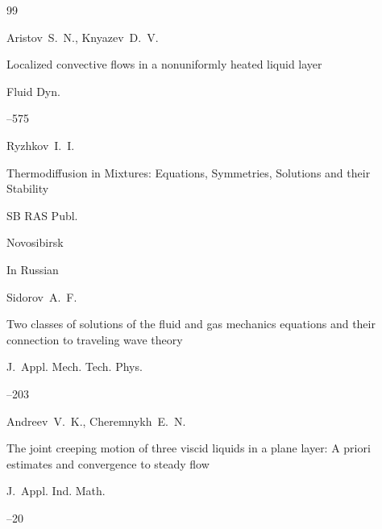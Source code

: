 \begin{thebibliography}{99}

\by Aristov~S.~N., Knyazev~D.~V.

\paper Localized convective flows in a nonuniformly heated liquid layer

\jour Fluid Dyn.




--575







\by Ryzhkov~I.~I. 

\book Thermodiffusion in Mixtures: Equations, Symmetries, Solutions and their Stability


\publ SB RAS Publ.

\publaddr Novosibirsk


\lang In Russian




\by Sidorov~A.~F.

\paper Two classes of solutions of the fluid and gas mechanics equations and their connection to traveling wave theory

\jour J.~Appl. Mech. Tech. Phys.




--203





\by Andreev~V.~K., Cheremnykh~E.~N.

\paper The joint creeping motion of three viscid liquids in a plane layer: A priori estimates and convergence to steady flow 

\jour J.~Appl. Ind. Math.




--20


\end{thebibliography}
